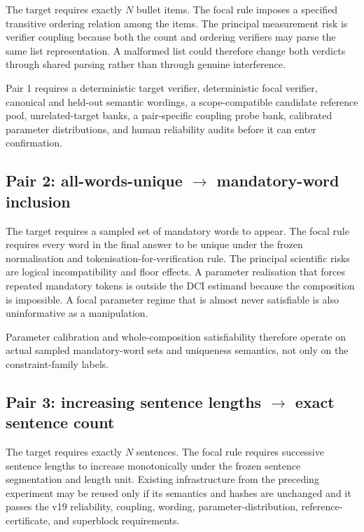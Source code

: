 \documentclass[11pt,a4paper]{article}
\begin{document}
The target requires exactly $N$ bullet items. The focal rule imposes a specified transitive ordering relation among the items. The principal measurement risk is verifier coupling because both the count and ordering verifiers may parse the same list representation. A malformed list could therefore change both verdicts through shared parsing rather than through genuine interference.

Pair 1 requires a deterministic target verifier, deterministic focal verifier, canonical and held-out semantic wordings, a scope-compatible candidate reference pool, unrelated-target banks, a pair-specific coupling probe bank, calibrated parameter distributions, and human reliability audits before it can enter confirmation.

\subsection{Pair 2: all-words-unique \texorpdfstring{$\rightarrow$}{to} mandatory-word inclusion}

The target requires a sampled set of mandatory words to appear. The focal rule requires every word in the final answer to be unique under the frozen normalisation and tokenisation-for-verification rule. The principal scientific risks are logical incompatibility and floor effects. A parameter realisation that forces repeated mandatory tokens is outside the DCI estimand because the composition is impossible. A focal parameter regime that is almost never satisfiable is also uninformative as a manipulation.

Parameter calibration and whole-composition satisfiability therefore operate on actual sampled mandatory-word sets and uniqueness semantics, not only on the constraint-family labels.

\subsection{Pair 3: increasing sentence lengths \texorpdfstring{$\rightarrow$}{to} exact sentence count}

The target requires exactly $N$ sentences. The focal rule requires successive sentence lengths to increase monotonically under the frozen sentence segmentation and length unit. Existing infrastructure from the preceding experiment may be reused only if its semantics and hashes are unchanged and it passes the v19 reliability, coupling, wording, parameter-distribution, reference-certificate, and superblock requirements.
\end{document}

